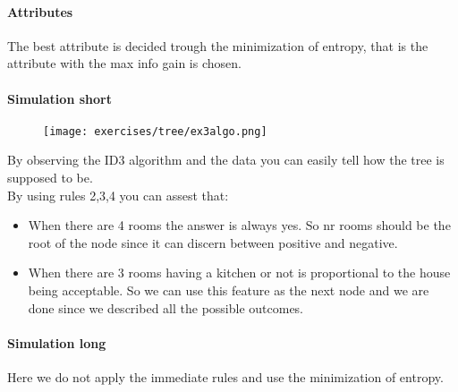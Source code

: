 \paragraph{Attributes}
The best attribute is decided trough the minimization of entropy, that is the attribute with the max info gain is chosen.


\paragraph{Simulation short}
\begin{figure}[H]
    \centering
    \texttt{[image: exercises/tree/ex3algo.png]}
\end{figure}


By observing the ID3 algorithm and the data you can easily tell how the tree is supposed to be.\\
By using rules 2,3,4 you can assest that:
\begin{itemize}
\item When there are 4 rooms the answer is always yes. So nr rooms should be the root of the node since it can discern between positive and negative.
\item When there are 3 rooms having a kitchen or not is proportional to the house being acceptable. So we can use this feature as the next node and we are done since we described all the possible outcomes. 
\end{itemize}

\paragraph{Simulation long}
Here we do not apply the immediate rules and use the minimization of entropy.\\

